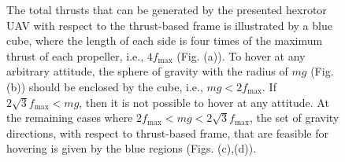 \documentclass[twocolumn,letterpaper]{IEEEAerospaceCLS}  %
\begin{document}
\begin{figure}
\centerline{
	}
\centerline{
	}
\caption{The total thrusts that can be generated by the presented hexrotor UAV with respect to the thrust-based frame is illustrated by a blue cube, where the length of each side is four times of the maximum thrust of each propeller, i.e., $4f_{\max}$ (Fig. (a)). To hover at any arbitrary attitude, the sphere of gravity with the radius of $mg$ (Fig. (b)) should be enclosed by the cube, i.e., $mg< 2f_{\max}$. If $2\sqrt{3}f_{\max} < mg$, then it is not possible to hover at any attitude. At the remaining cases where $2f_{\max}<mg<2\sqrt{3}f_{\max}$, the set of gravity directions, with respect to thrust-based frame, that are feasible for hovering is given by the blue regions (Figs. (c),(d)).
}
\end{figure}
\end{document}
